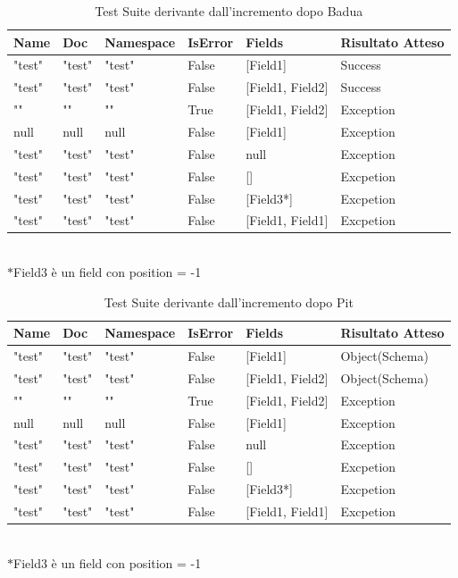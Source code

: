 \documentclass[12pt, a4paper]{article}
\begin{document}
\begin{table}[ht]
  \centering
  \caption[CreateRecord: Test Suite - Adequacy Control Flow]{Test Suite derivante dall'incremento dopo Badua}
  \begin{tabular}{|l|l|l|l|l|l|}
    \hline
    \textbf{Name} & \textbf{Doc} & \textbf{Namespace}  & \textbf{IsError} & \textbf{Fields} & \textbf{Risultato Atteso} \\
    \hline
    "test" & "test" & "test" & False & [Field1] & Success \\
    "test" & "test" & "test" & False & [Field1, Field2] & Success \\
    "" & "" & "" & True & [Field1, Field2] & Exception \\
    null & null & null & False & [Field1] & Exception \\
    "test" & "test" & "test" & False & null & Exception \\
    "test" & "test" & "test" & False & [] & Excpetion \\
    "test" & "test" & "test" & False & [Field3*] & Excpetion \\
    "test" & "test" & "test" & False & [Field1, Field1] & Excpetion \\
    \hline
  \end{tabular}
   \\$\ast$Field3 è un field con position = -1
  \label{tab:Badua1CreateRecord}
\end{table}
  
\begin{table}[ht]
  \centering
  \caption[CreateRecord: Test Suite - Mutation Testing]{Test Suite derivante dall'incremento dopo Pit}
  \begin{tabular}{|l|l|l|l|l|l|}
    \hline
    \textbf{Name} & \textbf{Doc} & \textbf{Namespace}  & \textbf{IsError} & \textbf{Fields} & \textbf{Risultato Atteso} \\
    \hline
    "test" & "test" & "test" & False & [Field1] & Object(Schema) \\
    "test" & "test" & "test" & False & [Field1, Field2] & Object(Schema) \\
    "" & "" & "" & True & [Field1, Field2] & Exception \\
    null & null & null & False & [Field1] & Exception \\
    "test" & "test" & "test" & False & null & Exception \\
    "test" & "test" & "test" & False & [] & Excpetion \\
    "test" & "test" & "test" & False & [Field3*] & Excpetion \\
    "test" & "test" & "test" & False & [Field1, Field1] & Excpetion \\
    \hline
  \end{tabular}
   \\$\ast$Field3 è un field con position = -1
  \label{tab:PitCreateRecord1}
\end{table}
  
\end{document}
